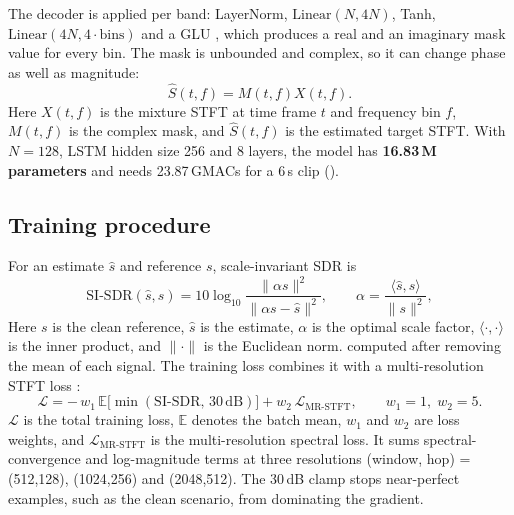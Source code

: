 \documentclass[11pt,a4paper]{article}
\begin{document}
The decoder is applied per band: LayerNorm, $\mathrm{Linear}(N,4N)$, Tanh,
$\mathrm{Linear}(4N,4\cdot\text{bins})$ and a GLU \cite{dauphin2017glu}, which produces a real and
an imaginary mask value for every bin. The mask is unbounded and complex, so it can change phase
as well as magnitude:
\begin{equation}
  \hat{S}(t,f)=M(t,f)X(t,f).
\end{equation}
Here $X(t,f)$ is the mixture STFT at time frame $t$ and frequency bin $f$, $M(t,f)$ is the
complex mask, and $\hat S(t,f)$ is the estimated target STFT.
With $N=128$, LSTM hidden size 256 and 8 layers, the model has \textbf{16.83\,M parameters} and
needs 23.87\,GMACs for a 6\,s clip ().

\subsection{Training procedure}
\label{sec:training}
For an estimate $\hat{s}$ and reference $s$, scale-invariant SDR \cite{leroux2019sdr} is
\begin{equation}
  \mathrm{SI\text{-}SDR}(\hat{s},s)=10\log_{10}\frac{\|\alpha s\|^2}{\|\alpha s-\hat{s}\|^2},
  \qquad
  \alpha=\frac{\langle\hat{s},s\rangle}{\|s\|^2},
  \label{eq:sisdr}
\end{equation}
Here $s$ is the clean reference, $\hat{s}$ is the estimate, $\alpha$ is the optimal scale factor,
$\langle\cdot,\cdot\rangle$ is the inner product, and $\|\cdot\|$ is the Euclidean norm.
computed after removing the mean of each signal. The training loss combines it with a
multi-resolution STFT loss \cite{yamamoto2020pwg}:
\begin{equation}
  \mathcal{L}=-\,w_1\,\mathbb{E}\big[\min(\mathrm{SI\text{-}SDR},\,30\,\mathrm{dB})\big]
  + w_2\,\mathcal{L}_{\text{MR-STFT}},
  \qquad w_1=1,\; w_2=5 .
  \label{eq:loss}
\end{equation}
$\mathcal{L}$ is the total training loss, $\mathbb{E}$ denotes the batch mean, $w_1$ and $w_2$
are loss weights, and $\mathcal{L}_{\text{MR-STFT}}$ is the multi-resolution spectral loss. It
sums spectral-convergence and log-magnitude terms at three
resolutions (window, hop) = (512,128), (1024,256) and (2048,512). The 30\,dB clamp stops
near-perfect examples, such as the clean scenario, from dominating the gradient.
\end{document}
